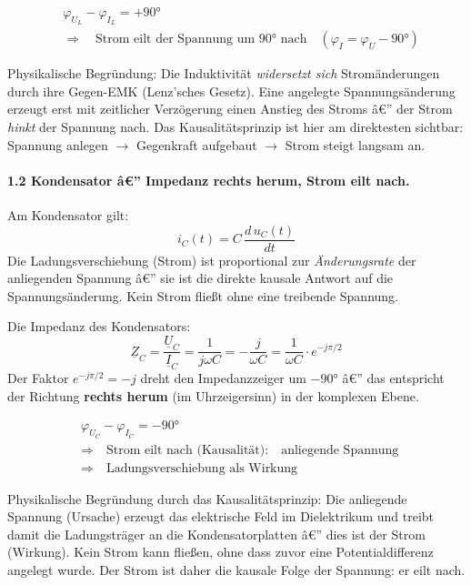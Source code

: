 ﻿\documentclass[12pt,a4paper,titlepage]{report}
\begin{document}
\begin{align}
	&\varphi_{U_L} - \varphi_{I_L} = +90 ° \\[4pt]
	&\Longrightarrow \quad
	\text{Strom eilt der Spannung um } 90 ° \text{ nach}
	\quad (\varphi_{I} = \varphi_{U} - 90 °)
\end{align}

Physikalische Begründung: Die Induktivität \emph{widersetzt sich} Stromänderungen durch
ihre Gegen-EMK (Lenz'sches Gesetz). Eine angelegte Spannungsänderung erzeugt erst mit
zeitlicher Verzögerung einen Anstieg des Stroms â€” der Strom \emph{hinkt} der Spannung
nach. Das Kausalitätsprinzip ist hier am direktesten sichtbar:
Spannung anlegen $\to$ Gegenkraft aufgebaut $\to$ Strom steigt langsam an.

\paragraph{1.2 \quad Kondensator â€” Impedanz rechts herum, Strom eilt nach.}

Am Kondensator gilt:
\[
	i_C(t) = C\,\frac{d\,u_C(t)}{dt}
\]
Die Ladungsverschiebung (Strom) ist proportional zur \emph{Änderungsrate} der
anliegenden Spannung â€” sie ist die direkte kausale Antwort auf die Spannungsänderung.
Kein Strom fließt ohne eine treibende Spannung.

Die Impedanz des Kondensators:
\[
	\underline{Z}_C = \frac{\underline{U}_C}{\underline{I}_C} = \frac{1}{j\omega C} = -\frac{j}{\omega C}
	= \frac{1}{\omega C}\cdot e^{-j\pi/2}
\]
Der Faktor $e^{-j\pi/2} = -j$ dreht den Impedanzzeiger um $-90 °$ â€” das entspricht der
Richtung \textbf{rechts herum} (im Uhrzeigersinn) in der komplexen Ebene.

\begin{align}
	&\varphi_{U_C} - \varphi_{I_C} = -90 ° \\[4pt]
	&\Longrightarrow \quad
	\text{Strom eilt nach (Kausalität):}
	\quad \text{anliegende Spannung} \;\\
	& \Longrightarrow \quad \text{Ladungsverschiebung als Wirkung}
\end{align}

Physikalische Begründung durch das Kausalitätsprinzip:
Die anliegende Spannung (Ursache) erzeugt das elektrische Feld im Dielektrikum und
treibt damit die Ladungsträger an die Kondensatorplatten â€” dies ist der Strom (Wirkung).
Kein Strom kann fließen, ohne dass zuvor eine Potentialdifferenz angelegt wurde.
Der Strom ist daher die kausale Folge der Spannung: er eilt nach.
\end{document}

